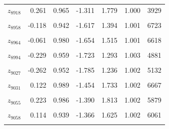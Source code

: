\begin{longtable}{lrrrrrr}
$z_{8918}$ & 0.261 & 0.965 & -1.311 & 1.779 & 1.000 & 3929\\
\cellcolor{gray!10}{$z_{8922}$} & \cellcolor{gray!10}{-0.164} & \cellcolor{gray!10}{0.967} & \cellcolor{gray!10}{-1.739} & \cellcolor{gray!10}{1.343} & \cellcolor{gray!10}{1.002} & \cellcolor{gray!10}{4934}\\
$z_{8958}$ & -0.118 & 0.942 & -1.617 & 1.394 & 1.001 & 6723\\
\cellcolor{gray!10}{$z_{8959}$} & \cellcolor{gray!10}{0.229} & \cellcolor{gray!10}{0.952} & \cellcolor{gray!10}{-1.294} & \cellcolor{gray!10}{1.736} & \cellcolor{gray!10}{1.007} & \cellcolor{gray!10}{5059}\\
$z_{8964}$ & -0.061 & 0.980 & -1.654 & 1.515 & 1.001 & 6618\\
\cellcolor{gray!10}{$z_{8968}$} & \cellcolor{gray!10}{-0.010} & \cellcolor{gray!10}{1.011} & \cellcolor{gray!10}{-1.605} & \cellcolor{gray!10}{1.630} & \cellcolor{gray!10}{1.001} & \cellcolor{gray!10}{6232}\\
$z_{8994}$ & -0.229 & 0.959 & -1.723 & 1.293 & 1.003 & 4881\\
\cellcolor{gray!10}{$z_{9017}$} & \cellcolor{gray!10}{0.001} & \cellcolor{gray!10}{1.000} & \cellcolor{gray!10}{-1.607} & \cellcolor{gray!10}{1.617} & \cellcolor{gray!10}{1.003} & \cellcolor{gray!10}{6481}\\
$z_{9027}$ & -0.262 & 0.952 & -1.785 & 1.236 & 1.002 & 5132\\
\cellcolor{gray!10}{$z_{9030}$} & \cellcolor{gray!10}{-0.207} & \cellcolor{gray!10}{0.954} & \cellcolor{gray!10}{-1.715} & \cellcolor{gray!10}{1.346} & \cellcolor{gray!10}{1.002} & \cellcolor{gray!10}{4915}\\
$z_{9031}$ & 0.122 & 0.989 & -1.454 & 1.733 & 1.002 & 6667\\
\cellcolor{gray!10}{$z_{9052}$} & \cellcolor{gray!10}{0.164} & \cellcolor{gray!10}{0.956} & \cellcolor{gray!10}{-1.360} & \cellcolor{gray!10}{1.697} & \cellcolor{gray!10}{1.004} & \cellcolor{gray!10}{5504}\\
$z_{9055}$ & 0.223 & 0.986 & -1.390 & 1.813 & 1.002 & 5879\\
\cellcolor{gray!10}{$z_{9057}$} & \cellcolor{gray!10}{-0.514} & \cellcolor{gray!10}{1.036} & \cellcolor{gray!10}{-2.157} & \cellcolor{gray!10}{1.184} & \cellcolor{gray!10}{1.002} & \cellcolor{gray!10}{2567}\\
$z_{9058}$ & 0.114 & 0.939 & -1.366 & 1.625 & 1.002 & 6061\\
\cellcolor{gray!10}{$z_{9062}$} & \cellcolor{gray!10}{0.084} & \cellcolor{gray!10}{0.991} & \cellcolor{gray!10}{-1.492} & \cellcolor{gray!10}{1.671} & \cellcolor{gray!10}{1.003} & \cellcolor{gray!10}{7456}\\

\end{longtable}
